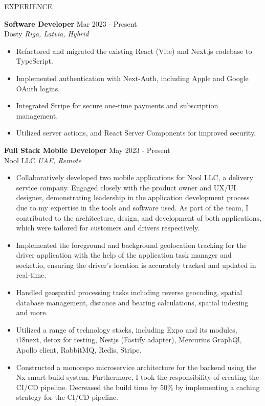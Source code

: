 \documentclass{resume} %
\begin{document}
\begin{rSection}{EXPERIENCE}

\textbf{Software Developer} \hfill Mar 2023 - Present\\
Dosty \hfill \textit{Riga, Latvia, Hybrid}
 \begin{itemize}
    \itemsep -3pt {} 
        \item Refactored and migrated the existing React (Vite) and Next.js codebase to TypeScript.
        \item Implemented authentication with Next-Auth, including Apple and Google OAuth logins.
        \item Integrated Stripe for secure one-time payments and subscription management.
        \item Utilized server actions, and React Server Components for improved security.
 \end{itemize}

\textbf{Full Stack Mobile Developer} \hfill May 2023 - Present\\
Nool LLC \hfill \textit{UAE, Remote}
 \begin{itemize}
    \itemsep -3pt {} 
        \item Collaboratively developed two mobile applications for Nool LLC, a delivery service company. Engaged closely with the product owner and UX/UI designer, demonstrating leadership in the application development process due to my expertise in the tools and software used. As part of the team, I contributed to the architecture, design, and development of both applications, which were tailored for customers and drivers respectively.
        \item Implemented the foreground and background geolocation tracking for the driver application with the help of the application task manager and socket.io, ensuring the driver's location is accurately tracked and updated in real-time.
        \item Handled geospatial processing tasks including reverse geocoding, spatial database management, distance and bearing calculations, spatial indexing and more.
        \item Utilized a range of technology stacks, including Expo and its modules, i18next, detox for testing, Nestjs (Fastify adapter), Mercurius GraphQl, Apollo client, RabbitMQ, Redis, Stripe.
        \item Constructed a monorepo microservice architecture for the backend using the Nx smart build system. Furthermore, I took the responsibility of creating the CI/CD pipeline. Decreased the build time by 50\% by implementing a caching strategy for the CI/CD pipeline.
 \end{itemize}


\end{rSection}
\end{document}
